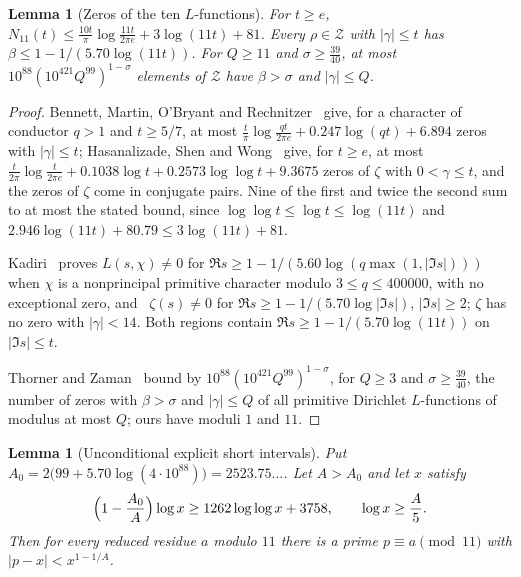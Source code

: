 \documentclass[11pt]{article}
\newtheorem{lemma}[theorem]{Lemma}
\theoremstyle{remark}
\newcommand{\Zeros}{\mathcal Z}
\begin{document}
\begin{lemma}[Zeros of the ten $L$-functions]\label{lem:zeros}
For $t\ge e$,
$N_{11}(t)\le\frac{10t}{\pi}\log\frac{11t}{2\pi e}+3\log(11t)+81$.
Every $\rho\in\Zeros$ with $|\gamma|\le t$ has
$\beta\le1-1/(5.70\log(11t))$.  For $Q\ge11$ and $\sigma\ge\frac{39}{40}$,
at most $10^{88}(10^{421}Q^{99})^{1-\sigma}$ elements of $\Zeros$ have
$\beta>\sigma$ and $|\gamma|\le Q$.
\end{lemma}

\begin{proof}
Bennett, Martin, O'Bryant and Rechnitzer~\cite[Cor.~1.2]{bmor-count} give,
for a character of conductor $q>1$ and $t\ge5/7$, at most
$\frac t\pi\log\frac{qt}{2\pi e}+0.247\log(qt)+6.894$ zeros with
$|\gamma|\le t$; Hasanalizade, Shen and Wong~\cite[Cor.~1.2]{hsw} give, for
$t\ge e$, at most
$\frac t{2\pi}\log\frac t{2\pi e}+0.1038\log t+0.2573\log\log t+9.3675$
zeros of $\zeta$ with $0<\gamma\le t$, and the zeros of $\zeta$ come in
conjugate pairs.  Nine of the first and twice the second sum to at most the
stated bound, since $\log\log t\le\log t\le\log(11t)$ and
$2.946\log(11t)+80.79\le3\log(11t)+81$.

Kadiri~\cite[Thm.~1.1]{kadiri} proves $L(s,\chi)\ne0$ for
$\Re s\ge1-1/(5.60\log(q\max(1,|\Im s|)))$ when $\chi$ is a nonprincipal
primitive character modulo $3\le q\le400000$, with no exceptional zero,
and~\cite{kadiri-zeta} $\zeta(s)\ne0$ for $\Re s\ge1-1/(5.70\log|\Im s|)$,
$|\Im s|\ge2$; $\zeta$ has no zero with $|\gamma|<14$.  Both regions
contain $\Re s\ge1-1/(5.70\log(11t))$ on $|\Im s|\le t$.

Thorner and Zaman~\cite[Thm.~1.2]{tz-density} bound by
$10^{88}(10^{421}Q^{99})^{1-\sigma}$, for $Q\ge3$ and
$\sigma\ge\frac{39}{40}$, the number of zeros with $\beta>\sigma$ and
$|\gamma|\le Q$ of all primitive Dirichlet $L$-functions of modulus at most
$Q$; ours have moduli $1$ and $11$.
\end{proof}

\begin{lemma}[Unconditional explicit short intervals]\label{lem:uncond}
Put $A_0=2\bigl(99+5.70\log(4\cdot10^{88})\bigr)=2523.75\ldots$.  Let
$A>A_0$ and let $x$ satisfy
\begin{equation}\label{eq:uncond}
  \Bigl(1-\frac{A_0}{A}\Bigr)\log x\ge1262\log\log x+3758,
  \qquad
  \log x\ge\frac A5 .
\end{equation}
Then for every reduced residue $a$ modulo $11$ there is a prime
$p\equiv a\pmod{11}$ with $|p-x|<x^{1-1/A}$.
\end{lemma}
\end{document}
